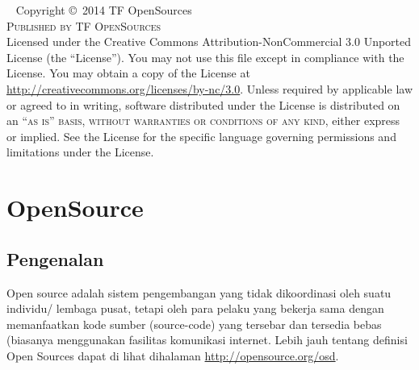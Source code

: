 \documentclass[11pt,fleqn]{book} %
\begin{document}
\newpage
~\vfill
\thispagestyle{empty}
\noindent Copyright \copyright\ 2014 TF OpenSources\\ %
\noindent \textsc{Published by TF OpenSources}\\ %
\noindent Licensed under the Creative Commons Attribution-NonCommercial 3.0 Unported License (the ``License''). You may not use this file except in compliance with the License. You may obtain a copy of the License at \url{http://creativecommons.org/licenses/by-nc/3.0}. Unless required by applicable law or agreed to in writing, software distributed under the License is distributed on an \textsc{``as is'' basis, without warranties or conditions of any kind}, either express or implied. See the License for the specific language governing permissions and limitations under the License.\\ %

\newpage
{} %
\pagestyle{empty} %
\tableofcontents %
\cleardoublepage %
\pagestyle{fancy} %

\newpage
{} %
\chapter{OpenSource}
\section{Pengenalan}
\begin{flushleft}
 \hspace{10pt} Open source adalah sistem pengembangan yang tidak dikoordinasi oleh suatu individu/ lembaga pusat, tetapi oleh para pelaku yang bekerja sama dengan memanfaatkan kode sumber (source-code) yang tersebar dan tersedia bebas (biasanya menggunakan fasilitas komunikasi internet. 
 Lebih jauh tentang definisi Open Sources dapat di lihat dihalaman \url{http://opensource.org/osd}.
\end{flushleft}
\end{document}
